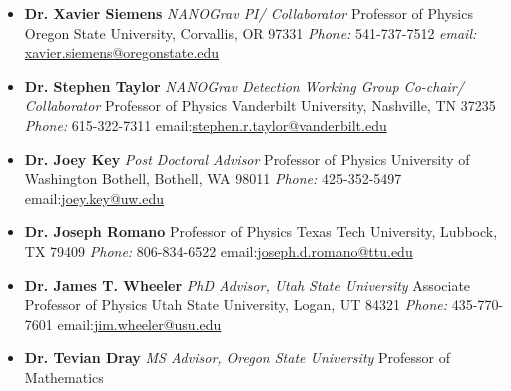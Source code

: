 \documentclass[11pt,letterpaper,sans,unicode]{moderncv}
\newcommand{\blucirc}{{\color{color1} $\circ\;\;$}}
\begin{document}
	\renewcommand\labelitemi{\blucirc}
	\begin{itemize}[leftmargin=8mm]
	\setlength\itemsep{0.05mm}
	\item \textbf{Dr. Xavier Siemens} \emph{NANOGrav PI/ Collaborator}
        		\newline Professor of Physics
		\newline Oregon State University, Corvallis, OR 97331
		\newline \emph{Phone:} 541-737-7512 \qquad \emph{email:} \url{xavier.siemens@oregonstate.edu}
		\newline
	\item \textbf{Dr. Stephen Taylor} \emph{NANOGrav Detection Working Group Co-chair/ Collaborator}
       		\newline Professor of Physics
		\newline Vanderbilt University, Nashville, TN 37235
		\newline \emph{Phone:} 615-322-7311 \qquad email:\url{stephen.r.taylor@vanderbilt.edu}
		\newline
	\item \textbf{Dr. Joey Key} \emph{Post Doctoral Advisor}
       		\newline Professor of Physics
		\newline University of Washington Bothell, Bothell, WA 98011
		\newline \emph{Phone:} 425-352-5497 \qquad email:\url{joey.key@uw.edu}
		\newline
	\item \textbf{Dr. Joseph Romano} %
       		\newline Professor of Physics
		\newline Texas Tech University, Lubbock, TX 79409
		\newline \emph{Phone:} 806-834-6522 \qquad email:\url{joseph.d.romano@ttu.edu}
		\newline
	\item \textbf{Dr. James T. Wheeler} \emph{PhD Advisor, Utah State University}
        		\newline Associate Professor of Physics
		\newline Utah State University, Logan, UT 84321
		\newline \emph{Phone:} 435-770-7601 \qquad email:\url{jim.wheeler@usu.edu}
		\newline
	\item \textbf{Dr. Tevian Dray} \emph{MS Advisor, Oregon State University}
     		\newline Professor of Mathematics

\end{itemize}
\end{document}
